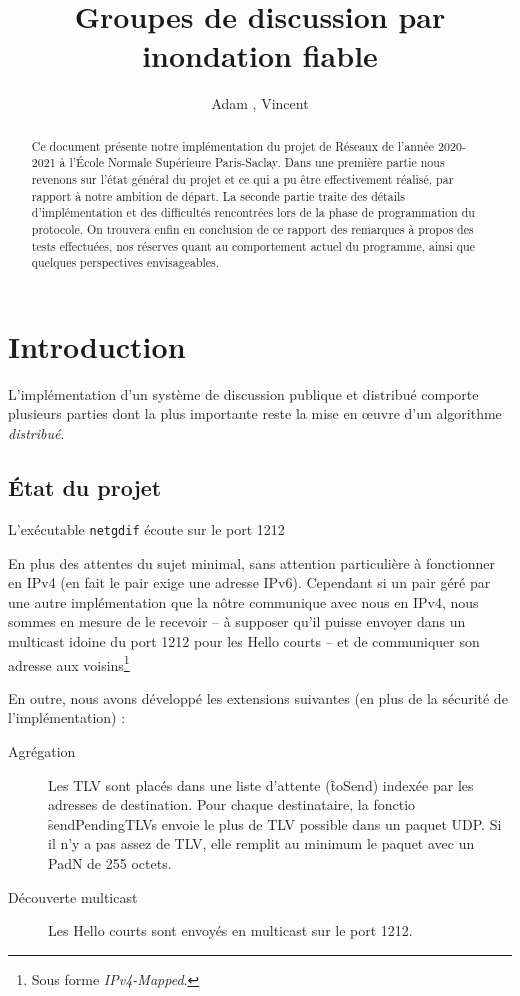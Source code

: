 \documentclass[11pt,a4paper]{article}
\title{Groupes de discussion par inondation fiable}
\author{Adam \bsc{Phillips}, Vincent \bsc{Bonczak}}
\begin{document}
  \maketitle
	
	\begin{abstract}
	Ce document présente notre implémentation du projet de Réseaux de l'année 2020-2021 à l'École Normale Supérieure Paris-Saclay. Dans une première partie
	nous revenons sur l'état général du projet et ce qui a pu être effectivement réalisé, par rapport à notre ambition de départ. La seconde partie traite 
	des détails d'implémentation et des difficultés rencontrées lors de la phase de programmation du protocole. On trouvera enfin en conclusion de ce rapport
	des remarques à propos des tests effectuées, nos réserves quant au comportement actuel du programme, ainsi que quelques perspectives envisageables.
	\end{abstract}
	
	
\section{Introduction}

L'implémentation d'un système de discussion publique et distribué comporte plusieurs parties dont la plus importante reste la mise en œuvre d'un algorithme \emph{distribué}.

\subsection{État du projet}

L'exécutable \texttt{netgdif} écoute sur le port 1212

En plus des attentes du sujet minimal, sans attention particulière à fonctionner en IPv4 (en fait le pair exige une adresse IPv6). Cependant si un pair géré par
une autre implémentation que la nôtre communique avec nous en IPv4, nous sommes en mesure de le recevoir -- à supposer qu'il puisse envoyer dans un multicast 
idoine du port 1212 pour les Hello courts -- et de communiquer son adresse aux voisins\footnote{Sous forme \emph{IPv4-Mapped}.} 

En outre, nous avons développé les extensions suivantes (en plus de la sécurité de l'implémentation) :
\begin{description}
\item[Agrégation] Les TLV sont placés dans une liste d'attente (\f{toSend}) indexée par les adresses de destination. Pour chaque destinataire, la fonctio \f{sendPendingTLVs}
envoie le plus de TLV possible dans un paquet UDP. Si il n'y a pas assez de TLV, elle remplit au minimum le paquet avec un PadN de 255 octets.
\item[Découverte multicast]Les Hello courts sont envoyés en multicast sur le port 1212.
\end{description}
\end{document}
